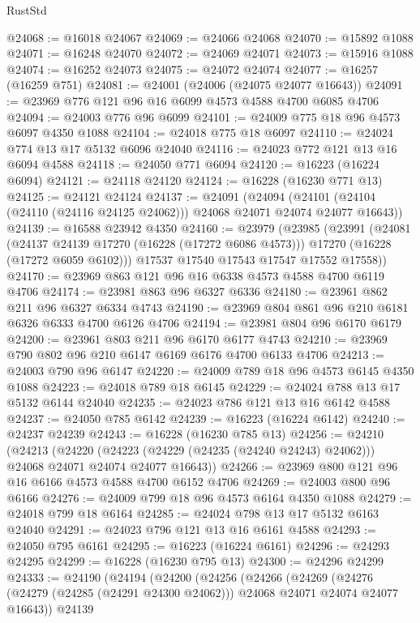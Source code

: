 \begin{lexlean}{RustStd}
\begin{coremodule}
@24068 := @16018 @24067
@24069 := @24066 @24068
@24070 := @15892 @1088
@24071 := @16248 @24070
@24072 := @24069 @24071
@24073 := @15916 @1088
@24074 := @16252 @24073
@24075 := @24072 @24074
@24077 := @16257 (@16259 @751)
@24081 := @24001 (@24006 (@24075 @24077 @16643))
@24091 := @23969 @776 @121 @96 @16 @6099 @4573 @4588 @4700 @6085 @4706
@24094 := @24003 @776 @96 @6099
@24101 := @24009 @775 @18 @96 @4573 @6097 @4350 @1088
@24104 := @24018 @775 @18 @6097
@24110 := @24024 @774 @13 @17 @5132 @6096 @24040
@24116 := @24023 @772 @121 @13 @16 @6094 @4588
@24118 := @24050 @771 @6094
@24120 := @16223 (@16224 @6094)
@24121 := @24118 @24120
@24124 := @16228 (@16230 @771 @13)
@24125 := @24121 @24124
@24137 := @24091
    (@24094 (@24101 (@24104 (@24110 (@24116 @24125 @24062))) @24068 @24071 @24074 @24077 @16643))
@24139 := @16588 @23942 @4350
@24160 := @23979
    (@23985
      (@23991
        (@24081
          (@24137 @24139 @17270 (@16228 (@17272 @6086 @4573)))
          @17270
          (@16228 (@17272 @6059 @6102)))
        @17537
        @17540
        @17543
        @17547
        @17552
        @17558))
@24170 := @23969 @863 @121 @96 @16 @6338 @4573 @4588 @4700 @6119 @4706
@24174 := @23981 @863 @96 @6327 @6336
@24180 := @23961 @862 @211 @96 @6327 @6334 @4743
@24190 := @23969 @804 @861 @96 @210 @6181 @6326 @6333 @4700 @6126 @4706
@24194 := @23981 @804 @96 @6170 @6179
@24200 := @23961 @803 @211 @96 @6170 @6177 @4743
@24210 := @23969 @790 @802 @96 @210 @6147 @6169 @6176 @4700 @6133 @4706
@24213 := @24003 @790 @96 @6147
@24220 := @24009 @789 @18 @96 @4573 @6145 @4350 @1088
@24223 := @24018 @789 @18 @6145
@24229 := @24024 @788 @13 @17 @5132 @6144 @24040
@24235 := @24023 @786 @121 @13 @16 @6142 @4588
@24237 := @24050 @785 @6142
@24239 := @16223 (@16224 @6142)
@24240 := @24237 @24239
@24243 := @16228 (@16230 @785 @13)
@24256 := @24210
    (@24213
      (@24220 (@24223 (@24229 (@24235 (@24240 @24243) @24062))) @24068 @24071 @24074 @24077 @16643))
@24266 := @23969 @800 @121 @96 @16 @6166 @4573 @4588 @4700 @6152 @4706
@24269 := @24003 @800 @96 @6166
@24276 := @24009 @799 @18 @96 @4573 @6164 @4350 @1088
@24279 := @24018 @799 @18 @6164
@24285 := @24024 @798 @13 @17 @5132 @6163 @24040
@24291 := @24023 @796 @121 @13 @16 @6161 @4588
@24293 := @24050 @795 @6161
@24295 := @16223 (@16224 @6161)
@24296 := @24293 @24295
@24299 := @16228 (@16230 @795 @13)
@24300 := @24296 @24299
@24333 := @24190
    (@24194
      (@24200
        (@24256
          (@24266
            (@24269
              (@24276 (@24279 (@24285 (@24291 @24300 @24062))) @24068 @24071 @24074 @24077 @16643))
            @24139

\end{coremodule}
\end{lexlean}
